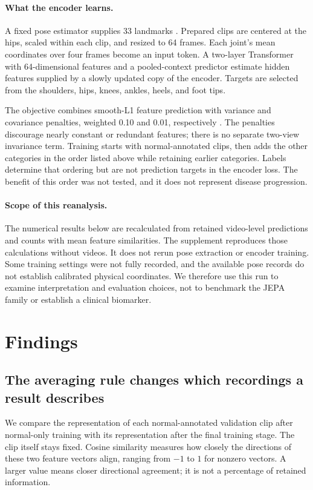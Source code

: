 \documentclass{article}
\begin{document}
\paragraph{What the encoder learns.}
A fixed pose estimator supplies 33 landmarks \citep{grishchenko2022blazepose}. Prepared clips are centered at the hips, scaled within each clip, and resized to 64 frames. Each joint's mean coordinates over four frames become an input token. A two-layer Transformer with 64-dimensional features and a pooled-context predictor estimate hidden features supplied by a slowly updated copy of the encoder. Targets are selected from the shoulders, hips, knees, ankles, heels, and foot tips.

The objective combines smooth-L1 feature prediction with variance and covariance penalties, weighted 0.10 and 0.01, respectively \citep{bardes2022vicreg}. The penalties discourage nearly constant or redundant features; there is no separate two-view invariance term. Training starts with normal-annotated clips, then adds the other categories in the order listed above while retaining earlier categories. Labels determine that ordering but are not prediction targets in the encoder loss. The benefit of this order was not tested, and it does not represent disease progression.

\paragraph{Scope of this reanalysis.}
The numerical results below are recalculated from retained video-level predictions and counts with mean feature similarities. The supplement reproduces those calculations without videos. It does not rerun pose extraction or encoder training. Some training settings were not fully recorded, and the available pose records do not establish calibrated physical coordinates. We therefore use this run to examine interpretation and evaluation choices, not to benchmark the JEPA family or establish a clinical biomarker.

\section{Findings}

\subsection{The averaging rule changes which recordings a result describes}

We compare the representation of each normal-annotated validation clip after normal-only training with its representation after the final training stage. The clip itself stays fixed. Cosine similarity measures how closely the directions of these two feature vectors align, ranging from $-1$ to $1$ for nonzero vectors. A larger value means closer directional agreement; it is not a percentage of retained information.
\end{document}
